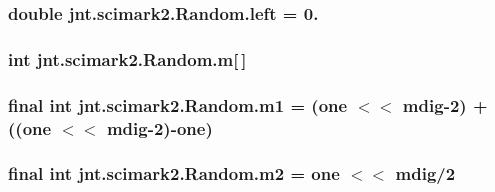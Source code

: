 \hypertarget{classjnt_1_1scimark2_1_1Random_a3d63c681768d9fba34385c730b12de22}{
\subsubsection[{left}]{\setlength{\rightskip}{0pt plus 5cm}double jnt.\-scimark2.\-Random.\-left = 0.\hspace{0.3cm}{\ttfamily [private]}}}\label{classjnt_1_1scimark2_1_1Random_a3d63c681768d9fba34385c730b12de22}
\hypertarget{classjnt_1_1scimark2_1_1Random_aed102d9fc6ee4e00f6ec50870b5ad88c}{
\subsubsection[{m}]{\setlength{\rightskip}{0pt plus 5cm}int jnt.\-scimark2.\-Random.\-m\mbox{[}$\,$\mbox{]}\hspace{0.3cm}{\ttfamily [private]}}}\label{classjnt_1_1scimark2_1_1Random_aed102d9fc6ee4e00f6ec50870b5ad88c}
\hypertarget{classjnt_1_1scimark2_1_1Random_ab7e096525b55f7e9368ba7aa4bffe41b}{
\subsubsection[{m1}]{\setlength{\rightskip}{0pt plus 5cm}final int jnt.\-scimark2.\-Random.\-m1 = ({\bf one} $<$$<$ {\bf mdig}-\/2) + (({\bf one} $<$$<$ {\bf mdig}-\/2)-\/{\bf one})\hspace{0.3cm}{\ttfamily [private]}}}\label{classjnt_1_1scimark2_1_1Random_ab7e096525b55f7e9368ba7aa4bffe41b}
\hypertarget{classjnt_1_1scimark2_1_1Random_a65a1436055bda1c6e25523e824e5373d}{
\subsubsection[{m2}]{\setlength{\rightskip}{0pt plus 5cm}final int jnt.\-scimark2.\-Random.\-m2 = {\bf one} $<$$<$ {\bf mdig}/2\hspace{0.3cm}{\ttfamily [private]}}}\label{classjnt_1_1scimark2_1_1Random_a65a1436055bda1c6e25523e824e5373d}
